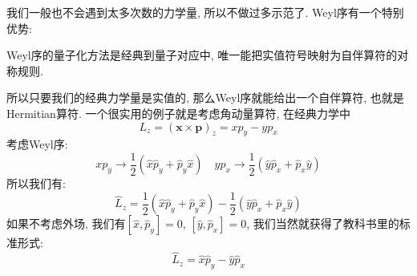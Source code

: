 我们一般也不会遇到太多次数的力学量, 所以不做过多示范了.
Weyl序有一个特别优势:
\begin{theorem}[][Weyl序的优势]
  Weyl序的量子化方法是经典到量子对应中, 唯一能把实值符号映射为自伴算符的对称规则.
\end{theorem}
所以只要我们的经典力学量是实值的, 那么Weyl序就能给出一个自伴算符, 也就是Hermitian算符.
一个很实用的例子就是考虑角动量算符, 在经典力学中
\begin{equation}
  L_z = (\bm{x} \times \bm{p} )_z = x p_y - y p_x
\end{equation}
考虑Weyl序:
\begin{equation}
  x p_y \to \frac{1}{2} (\hat{x} \hat{p}_y + \hat{p}_y \hat{x}) \quad y p_x \to \frac{1}{2} (\hat{y} \hat{p}_x + \hat{p}_x \hat{y})
\end{equation}
所以我们有:
\begin{equation}
  \hat{L}_z = \frac{1}{2} (\hat{x} \hat{p}_y + \hat{p}_y \hat{x}) - \frac{1}{2} (\hat{y} \hat{p}_x + \hat{p}_x \hat{y})
\end{equation}
如果不考虑外场, 我们有$[\hat{x}, \hat{p}_y] = 0$,  $[\hat{y}, \hat{p}_x] = 0$, 我们当然就获得了教科书里的标准形式:
\begin{equation}
  \hat{L}_z = \hat{x} \hat{p}_y - \hat{y} \hat{p}_x
\end{equation}


